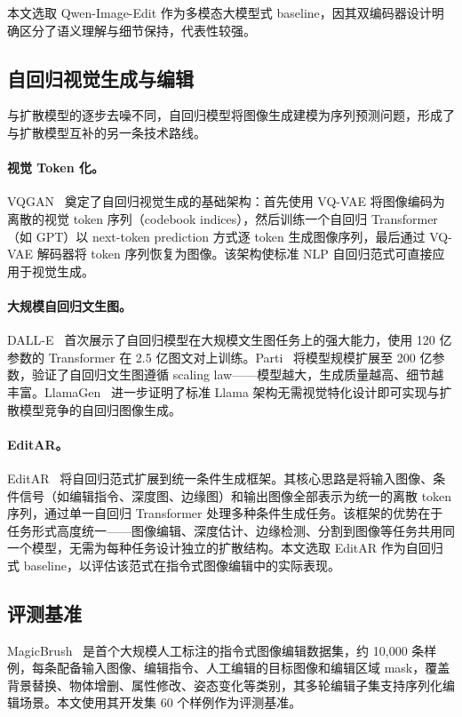 \documentclass[UTF8,11pt,a4paper,fontset=fandol]{ctexart}
\begin{document}
本文选取 Qwen-Image-Edit 作为多模态大模型式 baseline，因其双编码器设计明确区分了语义理解与细节保持，代表性较强。

\subsection{自回归视觉生成与编辑}

与扩散模型的逐步去噪不同，自回归模型将图像生成建模为序列预测问题，形成了与扩散模型互补的另一条技术路线。

\paragraph{视觉 Token 化。}
VQGAN~\cite{vqgan} 奠定了自回归视觉生成的基础架构：首先使用 VQ-VAE 将图像编码为离散的视觉 token 序列（codebook indices），然后训练一个自回归 Transformer（如 GPT）以 next-token prediction 方式逐 token 生成图像序列，最后通过 VQ-VAE 解码器将 token 序列恢复为图像。该架构使标准 NLP 自回归范式可直接应用于视觉生成。

\paragraph{大规模自回归文生图。}
DALL-E~\cite{dalle} 首次展示了自回归模型在大规模文生图任务上的强大能力，使用 120 亿参数的 Transformer 在 2.5 亿图文对上训练。Parti~\cite{parti} 将模型规模扩展至 200 亿参数，验证了自回归文生图遵循 scaling law——模型越大，生成质量越高、细节越丰富。LlamaGen~\cite{llamagen} 进一步证明了标准 Llama 架构无需视觉特化设计即可实现与扩散模型竞争的自回归图像生成。

\paragraph{EditAR。}
EditAR~\cite{editar} 将自回归范式扩展到统一条件生成框架。其核心思路是将输入图像、条件信号（如编辑指令、深度图、边缘图）和输出图像全部表示为统一的离散 token 序列，通过单一自回归 Transformer 处理多种条件生成任务。该框架的优势在于任务形式高度统一——图像编辑、深度估计、边缘检测、分割到图像等任务共用同一个模型，无需为每种任务设计独立的扩散结构。本文选取 EditAR 作为自回归式 baseline，以评估该范式在指令式图像编辑中的实际表现。

\subsection{评测基准}

MagicBrush~\cite{magicbrush} 是首个大规模人工标注的指令式图像编辑数据集，约 10,000 条样例，每条配备输入图像、编辑指令、人工编辑的目标图像和编辑区域 mask，覆盖背景替换、物体增删、属性修改、姿态变化等类别，其多轮编辑子集支持序列化编辑场景。本文使用其开发集 60 个样例作为评测基准。
\end{document}
